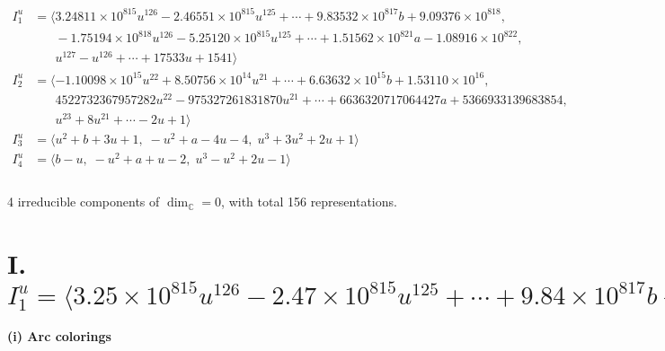 \documentclass[1p]{elsarticle_modified}
\theoremstyle{definition}
\begin{document}
\begin{align*}
I^u_{1}&=\langle 
3.24811\times10^{815} u^{126}-2.46551\times10^{815} u^{125}+\cdots+9.83532\times10^{817} b+9.09376\times10^{818},\\
\phantom{I^u_{1}}&\phantom{= \langle  }-1.75194\times10^{818} u^{126}-5.25120\times10^{815} u^{125}+\cdots+1.51562\times10^{821} a-1.08916\times10^{822},\\
\phantom{I^u_{1}}&\phantom{= \langle  }u^{127}- u^{126}+\cdots+17533 u+1541\rangle \\
I^u_{2}&=\langle 
-1.10098\times10^{15} u^{22}+8.50756\times10^{14} u^{21}+\cdots+6.63632\times10^{15} b+1.53110\times10^{16},\\
\phantom{I^u_{2}}&\phantom{= \langle  }4522732367957282 u^{22}-975327261831870 u^{21}+\cdots+6636320717064427 a+5366933139683854,\\
\phantom{I^u_{2}}&\phantom{= \langle  }u^{23}+8 u^{21}+\cdots-2 u+1\rangle \\
I^u_{3}&=\langle 
u^2+b+3 u+1,\;- u^2+a-4 u-4,\;u^3+3 u^2+2 u+1\rangle \\
I^u_{4}&=\langle 
b- u,\;- u^2+a+u-2,\;u^3- u^2+2 u-1\rangle \\
\\
\end{align*}
\raggedright * 4 irreducible components of $\dim_{\mathbb{C}}=0$, with total 156 representations.\\
\newpage
\renewcommand{\arraystretch}{1}
\centering \section*{I. $I^u_{1}= \langle 3.25\times10^{815} u^{126}-2.47\times10^{815} u^{125}+\cdots+9.84\times10^{817} b+9.09\times10^{818},\;-1.75\times10^{818} u^{126}-5.25\times10^{815} u^{125}+\cdots+1.52\times10^{821} a-1.09\times10^{822},\;u^{127}- u^{126}+\cdots+17533 u+1541 \rangle$}
\flushleft \textbf{(i) Arc colorings}\\
\end{document}
